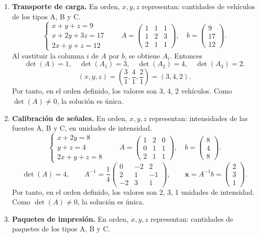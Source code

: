 \documentclass[11pt,a4paper]{article}
\begin{document}
\begin{enumerate}
\newpage
\item \textbf{Transporte de carga.} En orden, $x,y,z$ representan: cantidades de vehículos de los tipos A, B y C.
\[\begin{cases}x+y+z=9\\x+2y+3z=17\\2x+y+z=12\end{cases}\qquad A=\begin{pmatrix}1&1&1\\1&2&3\\2&1&1\end{pmatrix},\quad b=\begin{pmatrix}9\\17\\12\end{pmatrix}.\]
Al sustituir la columna $i$ de $A$ por $b$, se obtiene $A_i$. Entonces
\[\det(A)=1,\quad \det(A_1)=3,\quad \det(A_2)=4,\quad \det(A_3)=2.\]
\[(x,y,z)=\left(\frac{3}{1},\frac{4}{1},\frac{2}{1}\right)=(3,4,2).\]
Por tanto, en el orden definido, los valores son 3, 4, 2 vehículos. Como $\det(A)\ne0$, la solución es única.
\item \textbf{Calibración de señales.} En orden, $x,y,z$ representan: intensidades de las fuentes A, B y C, en unidades de intensidad.
\[\begin{cases}x+2y=8\\y+z=4\\2x+y+z=8\end{cases}\qquad A=\begin{pmatrix}1&2&0\\0&1&1\\2&1&1\end{pmatrix},\quad b=\begin{pmatrix}8\\4\\8\end{pmatrix}.\]
\[\det(A)=4,\qquad A^{-1}=\frac{1}{4}\begin{pmatrix}0&-2&2\\2&1&-1\\-2&3&1\end{pmatrix},\qquad \mathbf{x}=A^{-1}b=\begin{pmatrix}2\\3\\1\end{pmatrix}.\]
Por tanto, en el orden definido, los valores son 2, 3, 1 unidades de intensidad. Como $\det(A)\ne0$, la solución es única.
\item \textbf{Paquetes de impresión.} En orden, $x,y,z$ representan: cantidades de paquetes de los tipos A, B y C.

\end{enumerate}
\end{document}
